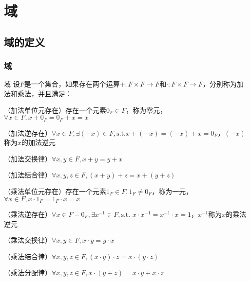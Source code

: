 \documentclass[12pt, a4paper, oneside, UTF8]{ctexbook}
\begin{document}
% 
\else
\fi
\chapter{域}
	\section{域的定义}
		\subsection{域}
			\begin{defn}{域}{}
				设$F$是一个集合，如果存在两个运算$+:F \times F \rightarrow F$和$\cdot :F \times F \rightarrow F$，分别称为加法和乘法，并且满足：
				
				（加法单位元存在）存在一个元素$0_F \in F$，称为零元，$\forall x \in F,x+0_F=0_F+x=x$
				
				（加法逆存在）$ \forall x \in F,\exists (-x) \in F,\text{s.t.}x+(-x)=(-x)+x=0_F$，$(-x)$称为$x$的加法逆元
				
				（加法交换律）$\forall x,y \in F,x+y = y+x$
				
				（加法结合律）$\forall x,y,z \in F,(x+y)+z = x+(y+z)$
				
				（乘法单位元存在）存在一个元素$1_F \in F,1_F \neq 0_F$，称为一元，$\forall x \in F,x\cdot 1_F=1_F \cdot x = x$
				
				（乘法逆存在）$\forall x \in F-{0_F},\exists x^{-1} \in F,\text{s.t. }x\cdot x^{-1}=x^{-1} \cdot x = 1$，$x^{-1}$称为$x$的乘法逆元
				
				（乘法交换律）$\forall x,y \in F,x\cdot y = y\cdot x$
				
				（乘法结合律）$\forall x,y,z \in F,(x\cdot y)\cdot z = x\cdot (y\cdot z)$
				
				（乘法分配律）$\forall x,y,z \in F,x\cdot(y+z)=x\cdot y+x\cdot z$
			\end{defn}
\end{document}
